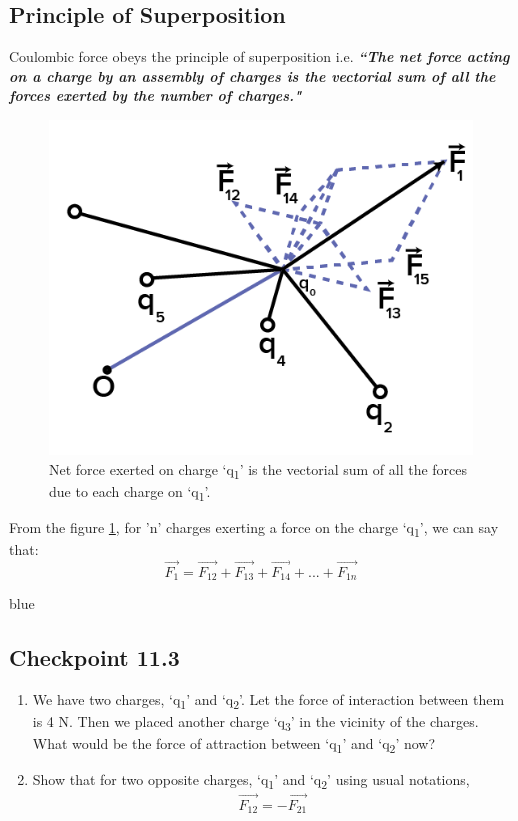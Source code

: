 \subsection{Principle of Superposition}
Coulombic force obeys the principle of superposition i.e. \textit{\textbf{``The net force acting on a charge
by an assembly of charges is the vectorial
sum of all the forces exerted by the number of charges."}}
\begin{figure}[H]
  \centering
  \captionsetup{justification = centering}
  \includegraphics[scale = 1.2]{Images/11.2.png}
  \caption{Net force exerted  on charge `q\textsubscript{1}' is 
  the vectorial sum of all the forces due to each charge on `q\textsubscript{1}'.}
  \label{fig:11.2}
\end{figure}
From the figure \ref{fig:11.2}, for 'n' charges exerting a
force on the charge `q\textsubscript{1}', we can say that:
\begin{equation}  
  \vec{F_{1}} = \vec{F_{12}} + \vec{F_{13}} + \vec{F_{14}}+...+\vec{F_{1n}} \nonumber
\end{equation}
\begin{mybox}{blue}{}
\subsection*{Checkpoint 11.3}
\begin{enumerate}[label=(\alph*)]
  \item We have two charges, `q\textsubscript{1}' and `q\textsubscript{2}'.
  Let the force of interaction between them is 4 N. Then we placed another charge `q\textsubscript{3}' in the vicinity of the charges.
  What would be the force of attraction between `q\textsubscript{1}' and `q\textsubscript{2}' now?
  \item Show that for two opposite charges, `q\textsubscript{1}' and `q\textsubscript{2}' using usual notations,
  \begin{equation}
    \vec{F_{12}} = -\vec{F_{21}} \nonumber
  \end{equation}
\end{enumerate}
\end{mybox}
